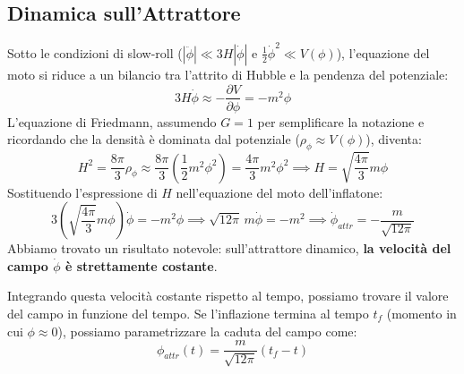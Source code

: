 \documentclass[11pt,a4paper]{report}
\begin{document}
\subsection{Dinamica sull'Attrattore}
Sotto le condizioni di slow-roll ($|\ddot{\phi}| \ll 3H|\dot{\phi}|$ e $\frac{1}{2}\dot{\phi}^2 \ll V(\phi)$), l'equazione del moto si riduce a un bilancio tra l'attrito di Hubble e la pendenza del potenziale:
\begin{equation}
3H\dot{\phi} \approx -\frac{\partial V}{\partial \phi} = -m^2 \phi
\end{equation}
L'equazione di Friedmann, assumendo $G=1$ per semplificare la notazione e ricordando che la densità è dominata dal potenziale ($\rho_\phi \approx V(\phi)$), diventa:
\begin{equation}
H^2 = \frac{8\pi}{3}\rho_\phi \approx \frac{8\pi}{3} \left( \frac{1}{2}m^2 \phi^2 \right) = \frac{4\pi}{3} m^2 \phi^2 \implies H = \sqrt{\frac{4\pi}{3}} m \phi
\end{equation}
Sostituendo l'espressione di $H$ nell'equazione del moto dell'inflatone:
\begin{equation}
3 \left( \sqrt{\frac{4\pi}{3}} m \phi \right) \dot{\phi} = -m^2 \phi \implies \sqrt{12\pi} \, m \dot{\phi} = -m^2 \implies \dot{\phi}_{attr} = -\frac{m}{\sqrt{12\pi}}
\end{equation}
Abbiamo trovato un risultato notevole: sull'attrattore dinamico, \textbf{la velocità del campo $\dot{\phi}$ è strettamente costante}. 

Integrando questa velocità costante rispetto al tempo, possiamo trovare il valore del campo in funzione del tempo. Se l'inflazione termina al tempo $t_f$ (momento in cui $\phi \approx 0$), possiamo parametrizzare la caduta del campo come:
\begin{equation}
\phi_{attr}(t) = \frac{m}{\sqrt{12\pi}} (t_f - t)
\end{equation}
\end{document}
